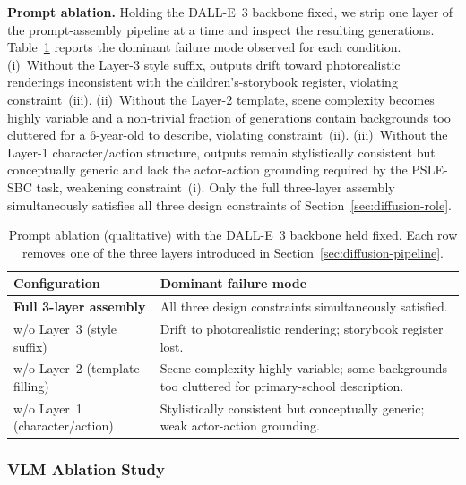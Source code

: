 \documentclass{article}
\begin{document}
\noindent\textbf{Prompt ablation.}
Holding the DALL-E~3 backbone fixed, we strip one layer of the
prompt-assembly pipeline at a time and inspect the resulting
generations. Table~\ref{tab:diffusion-prompt-abl} reports the dominant
failure mode observed for each condition. (i)~Without the Layer-3 style
suffix, outputs drift toward photorealistic renderings inconsistent
with the children's-storybook register, violating constraint~(iii).
(ii)~Without the Layer-2 template, scene complexity becomes highly
variable and a non-trivial fraction of generations contain backgrounds
too cluttered for a 6-year-old to describe, violating
constraint~(ii). (iii)~Without the Layer-1 character/action structure,
outputs remain stylistically consistent but conceptually generic and
lack the actor-action grounding required by the PSLE-SBC task,
weakening constraint~(i). Only the full three-layer assembly
simultaneously satisfies all three design constraints of
Section~\ref{sec:diffusion-role}.

\begin{table}[t]
\centering
\caption{Prompt ablation (qualitative) with the DALL-E~3 backbone held
fixed. Each row removes one of the three layers introduced in
Section~\ref{sec:diffusion-pipeline}.}
\label{tab:diffusion-prompt-abl}
\scriptsize
\setlength{\tabcolsep}{4pt}
\begin{tabular}{p{}p{}}
\toprule
\textbf{Configuration} & \textbf{Dominant failure mode}\\
\midrule
\textbf{Full 3-layer assembly}     & All three design constraints
                                     simultaneously satisfied.\\
w/o Layer~3 (style suffix)         & Drift to photorealistic
                                     rendering; storybook register
                                     lost.\\
w/o Layer~2 (template filling)     & Scene complexity highly variable;
                                     some backgrounds too cluttered
                                     for primary-school description.\\
w/o Layer~1 (character/action)     & Stylistically consistent but
                                     conceptually generic; weak
                                     actor-action grounding.\\
\bottomrule
\end{tabular}
\end{table}

\subsubsection{VLM Ablation Study}
\label{sec:vlm-ablation}
\end{document}
